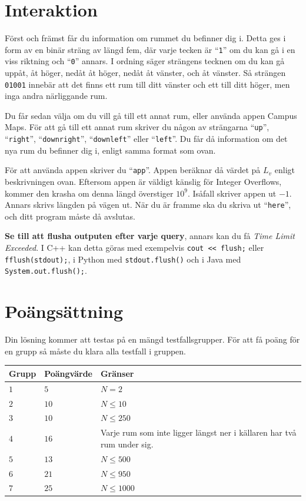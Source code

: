 \section*{Interaktion}
Först och främst får du information om rummet du befinner dig i. Detta ges i form av en binär sträng av längd fem,
där varje tecken är ``\texttt{1}'' om du kan gå i en viss riktning och ``\texttt{0}'' annars. I ordning säger strängens tecknen
om du kan gå uppåt, åt höger, nedåt åt höger, nedåt åt vänster, och åt vänster. 
Så strängen \texttt{01001} innebär att det finns ett rum till ditt vänster och ett till ditt höger, 
men inga andra närliggande rum.

Du får sedan välja om du vill gå till ett annat rum, eller använda appen Campus Maps.
För att gå till ett annat rum skriver du någon av strängarna 
``\texttt{up}'', ``\texttt{right}'', ``\texttt{downright}'', ``\texttt{downleft}'' eller ``\texttt{left}''.
Du får då information om det nya rum du befinner dig i, enligt samma format som ovan.

För att använda appen skriver du ``\texttt{app}''. 
Appen beräknar då värdet på $L_v$ enligt beskrivningen ovan.
Eftersom appen är väldigt känslig för Integer Overflows, kommer den krasha om denna längd
överstiger $10^9$. Isåfall skriver appen ut $-1$. Annars skrivs längden på vägen ut. 
När du är framme ska du skriva ut ``\texttt{here}'', och ditt program måste då avslutas.

\textbf{Se till att flusha outputen efter varje query}, annars kan du få \textit{Time Limit Exceeded}.
I C++ kan detta göras med exempelvis \texttt{cout << flush;}
eller \texttt{fflush(stdout);},
i Python med \texttt{stdout.flush()}
och i Java med \texttt{System.out.flush();}.

\section*{Poängsättning}
Din lösning kommer att testas på en mängd testfallsgrupper.
För att få poäng för en grupp så måste du klara alla testfall i gruppen.

\noindent
\begin{tabular}{| l | l | l |}
  \hline
  Grupp & Poängvärde & Gränser \\ \hline \hline
  $1$   & $5$        & $N = 2$ \\ \hline
  $2$   & $10$        & $N \leq 10$ \\ \hline
  $3$   & $10$        & $N \leq 250$ \\ \hline
  $4$   & $16$        & Varje rum som inte ligger längst ner i källaren har två rum under sig. \\ \hline
  $5$   & $13$        & $N \leq 500$ \\ \hline
  $6$   & $21$        & $N \leq 950$ \\ \hline
  $7$   & $25$        & $N \leq 1000$ \\ \hline
\end{tabular}
